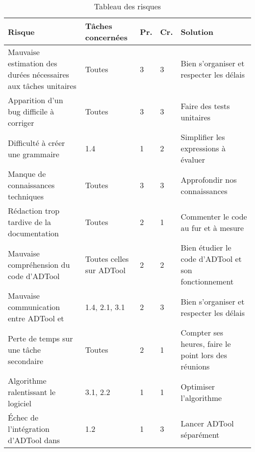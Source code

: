 	\begin{table}[H]
		\centering
		\begin{tabular}{|p{4cm}|l|l|l|p{4cm}|}
		\hline
            \textbf{Risque} & \textbf{Tâches concernées} & \textbf{Pr.} & \textbf{Cr.} & \textbf{Solution}\\
            \hline
            Mauvaise estimation des durées nécessaires aux tâches unitaires & 
                Toutes & 3 & 3 &
                Bien s'organiser et respecter les délais\\ 
            \hline
            Apparition d'un bug difficile à corriger & 
                Toutes & 3 & 3 &
                Faire des tests unitaires\\
            \hline
            Difficulté à créer une grammaire & 
                1.4 & 1 & 2 &
                Simplifier les expressions à évaluer\\ 
            \hline
            Manque de connaissances techniques & 
                Toutes & 3 & 3 &
                Approfondir nos connaissances\\ 
            \hline
            Rédaction trop tardive de la documentation & 
                Toutes & 2 & 1 &
                Commenter le code au fur et à mesure\\
            \hline
            Mauvaise compréhension du code d'ADTool & 
                Toutes celles sur ADTool & 2 & 2 &
                Bien étudier le code d'ADTool et son fonctionnement\\ 
            \hline
            Mauvaise communication entre ADTool et \glasir{} & 
                1.4, 2.1, 3.1 & 2 & 3 &
                Bien s'organiser et respecter les délais\\ 
            \hline
            Perte de temps sur une tâche secondaire & 
                Toutes & 2 & 1 &
                Compter ses heures, faire le point lors des réunions\\ 
            \hline
            Algorithme ralentissant le logiciel & 
                3.1, 2.2 & 1 & 1 &
                Optimiser l’algorithme\\ 
            \hline
            Échec de l'intégration d'ADTool dans \glasir{} & 
                1.2 & 1 & 3 &
                Lancer ADTool séparément\\ 
            \hline
		\end{tabular}
		\caption{Tableau des risques}
		\label{fig:risques}
	\end{table}
